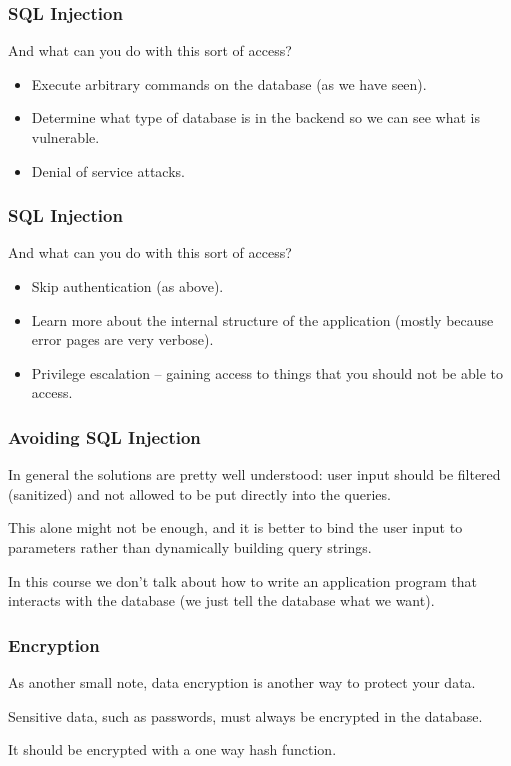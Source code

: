 \begin{frame}
\frametitle{SQL Injection}

And what can you do with this sort of access?
\begin{itemize}
	\item Execute arbitrary commands on the database (as we have seen).
	\item Determine what type of database is in the backend so we can see what is vulnerable.
	\item Denial of service attacks.
	\end{itemize}

\end{frame}


\begin{frame}
\frametitle{SQL Injection}

And what can you do with this sort of access?
\begin{itemize}

	\item Skip authentication (as above).
	\item Learn more about the internal structure of the application (mostly because error pages are very verbose).
	\item Privilege escalation -- gaining access to things that you should not be able to access.
\end{itemize}

\end{frame}



\begin{frame}
\frametitle{Avoiding SQL Injection}

In general the solutions are pretty well understood: user input should be filtered (sanitized) and not allowed to be put directly into the queries. 

This alone might not be enough, and it is better to bind the user input to parameters rather than dynamically building query strings. 

In this course we don't talk about how to write an application program that interacts with the database (we just tell the database what we want). 


\end{frame}



\begin{frame}
\frametitle{Encryption}

As another small note, data encryption is another way to protect your data. 

Sensitive data, such as passwords, must always be encrypted in the database. 

It should be encrypted with a one way hash function. 

\end{frame}



